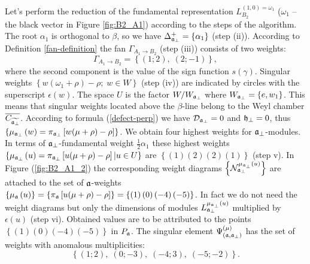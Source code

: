 Let's perform the reduction of the fundamental representation $L^{(1,0)=\omega_1}_{B_2}$
($\omega_1$ -- the black vector in Figure \ref{fig:B2_A1}) according to the steps of the algorithm.
The root $\alpha_1$ is orthogonal to $\beta$,
so we have $\Delta_{\mathfrak{a}_{\bot}}^+ = \left\{ \alpha_1 \right\}$ (step (ii)).
According to Definition \ref{fan-definition}
the fan $\Gamma_{A_1\to B_2}$ (step (iii)) consists of two weights:
\begin{equation*}
  \label{eq:22}
  \Gamma_{A_1\to B_2}=\left\{ (1;2),\; (2;-1) \right\},
\end{equation*}
where the second component is the value of the sign function $s(\gamma)$.
Singular weights  $\left\{ w (\omega_1 +\rho)-\rho ;\;w \in W\right\}$ (step (iv))
are indicated by circles with the superscript $\epsilon\left( w \right)$.
The space $U$ is the factor $W/W_{\mathfrak{a}_{\bot}}$ where $W_{\mathfrak{a}_{\bot}}=\left\{e,w_1\right\}$.
This means that singular weights located above the $\beta$-line
belong to the Weyl chamber $\overline{C_{\widetilde{\mathfrak{a}_{\perp }}}}$.
According to formula (\ref{defect-perp}) we have $\mathcal{D}_{\mathfrak{a}_{\perp }}=0$ and
$\mathfrak{h}_{\perp }=0$, thus $\left\{ \mu _{\mathfrak{a}_{\perp }}\left( w\right)
=\pi _{\mathfrak{a}_{\perp }}\left[ w(\mu +\rho)-\rho \right]\right\}$.
We obtain four highest weights for $\mathfrak{a}_{\perp }$-modules. In terms of
$\mathfrak{a}_{\perp }$-fundamental weight $\frac{1}{2} \alpha_1$ these highest weights
$\left\{ \mu _{\mathfrak{a}_{\perp }}\left( u\right)
=\pi _{\mathfrak{a}_{\perp }}\left[ u(\mu +\rho)-\rho \right]| u \in U \right\}$
 are
$\left\{ \left( 1\right) \left( 2\right) \left( 2\right) \left( 1\right) \right\}$ (step v).
In Figure (\ref{fig:B2_A1_2}) the corresponding weight diagrams
$\left\{ \mathcal{N}_{\mathfrak{a}_{\perp }}^{\mu _{\mathfrak{a}_{\perp }}\left( u\right) }\right\} $
are attached to the set of $\mathfrak{a}$-weights
$\left\{ \mu _{\mathfrak{a}}\left( u\right)\right\} =\left\{\pi _{\mathfrak{a}}\left[ u(\mu +\rho )-\rho \right]\right\}
=\left\{ \left( 1\right) \left( 0\right) \left( -4\right) \left( -5\right) \right\}$.
In fact we do not need the
weight diagrams but only the dimensions of modules
$L_{\mathfrak{a}_{\perp }}^{\mu_{\mathfrak{a}_{\perp }}\left( u\right) }$ multiplied by
$\epsilon \left( u\right) $ (step vi). Obtained values are to be attributed to the points
$\left\{ \left( 1\right) \left( 0\right) \left( -4\right) \left( -5\right) \right\}$
in $P_{\mathfrak{a}}$. The singular element $\Psi ^{\left( \mu \right) }_{\left(  \mathfrak{a}, \mathfrak{a}_{\bot} \right)}$
has the set of weights with anomalous multiplicities:
\begin{equation}
  \label{eq:25}
  \left\{(1;2),\; (0;-3),\; (-4;3),\; (-5;-2)\right\}.
\end{equation}

